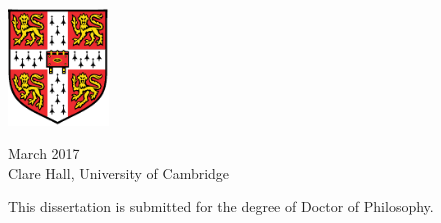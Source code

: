 
\begin{titlepage}

\begin{addmargin}[-1cm]{-3cm}
\begin{center}
\large

\hfill
\vfill

\begingroup
\color{Maroon} \\ \bigskip
\endgroup


\vfill
\includegraphics[width=0.20\textwidth]{images/University_Crest} \\ \medskip

\vspace{4em}

March 2017 \\
\medskip
Clare Hall, University of Cambridge

\vspace{2em}


{\small This dissertation is submitted for the degree of Doctor of Philosophy.}


\vfill

\end{center}
\end{addmargin}

\end{titlepage}
